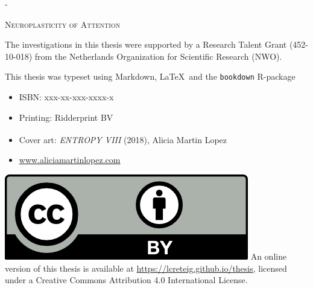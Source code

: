 
\setlength{\abstitleskip}{-\absparindent}

\pagestyle{empty}
\renewcommand{\thepage}{\CoverName} %


\frontmatter
\pagestyle{empty} 
\def\drop{.1\textheight}
\newlength{\mylength}

\vspace*{\drop}
\calccentering{\mylength}
\begin{adjustwidth*}{\mylength}{-\mylength} %
\begin{center}
\Huge \textsc{Neuroplasticity of Attention}
\end{center}
\end{adjustwidth*}

\clearpage
\vspace*{\fill}
\begingroup %
\small
\setlength{\parskip}{\baselineskip} %
\setlength\parindent{0pt} %
The investigations in this thesis were supported by 
a Research Talent Grant (452-10-018)   
from 
the Netherlands Organization for Scientific Research (NWO).

This thesis was typeset using Markdown, \LaTeX\ and the \verb+bookdown+ R-package
\begin{itemize}[label={}, itemsep=0pt, partopsep=0pt, topsep=-\parskip, parsep=0pt, leftmargin=1em]
  \item ISBN: xxx-xx-xxx-xxxx-x  %
  \item Printing: Ridderprint BV 
  \item Cover art: \textit{ENTROPY VIII} (2018), Alicia Martin Lopez{\large\textsuperscript{\textcopyright}}
  \item \url{www.aliciamartinlopez.com}
\end{itemize}

\vspace{\baselineskip}
\includegraphics{_bookdown_files/CC-BY.png} \newline
An online version of this thesis is available at 
\url{https://lcreteig.github.io/thesis},
licensed under a 
Creative Commons Attribution 4.0 International License.
\endgroup

